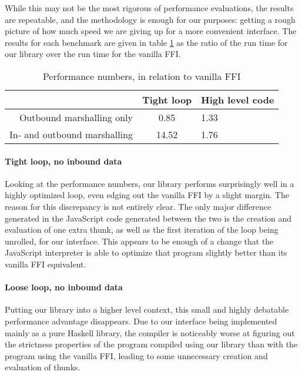 \documentclass[preprint]{sigplanconf}
\begin{document}
While this may not be the most rigorous of performance evaluations,
the results are repeatable, and the methodology is enough for our purposes:
getting a rough picture of how much speed we are giving up for a more
convenient interface.
The results for each benchmark are given in table \ref{tbl:performance} as
the ratio of the run time for our library over the run time for the vanilla
FFI.

\begin{table}
  \renewcommand{\arraystretch}{1.5}
  \begin{center}
    \begin{tabular}{|r|c|l|}
      \hline
                                   & Tight loop & High level code \\
      \hline
      Outbound marshalling only    & 0.85       & 1.33 \\
      \hline
      In- and outbound marshalling & 14.52      & 1.76 \\
      \hline
    \end{tabular}
  \end{center}
  \caption{Performance numbers, in relation to vanilla FFI}
  \label{tbl:performance}
\end{table}

\paragraph{Tight loop, no inbound data}
Looking at the performance numbers, our library performs surprisingly well in
a highly optimized loop, even edging out the vanilla FFI by a slight margin.
The reason for this discrepancy is not entirely clear. The only major difference
generated in the JavaScript code generated between the two is the creation and
evaluation of one extra thunk, as well as the first iteration of the loop
being unrolled, for our interface. This appears to be enough of a change that
the JavaScript interpreter is able to optimize that program slightly better
than its vanilla FFI equivalent.

\paragraph{Loose loop, no inbound data}
Putting our library into a higher level context, this small and highly
debatable performance advantage disappears. Due to our interface being
implemented mainly as a pure Haskell library, the compiler is noticeably worse
at figuring out the strictness properties of the program compiled using our
library than with the program using the vanilla FFI, leading to some
unnecessary creation and evaluation of thunks.
\end{document}
